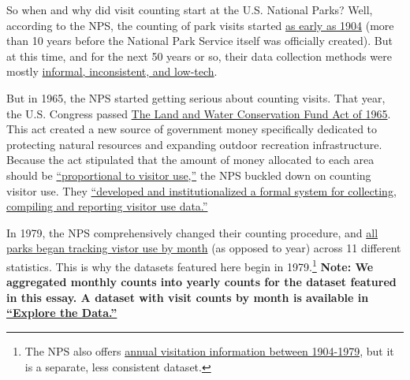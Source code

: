 \documentclass[
  letterpaper,
  DIV=11,
  numbers=noendperiod]{scrartcl}
\begin{document}
So when and why did visit counting start at the U.S. National Parks?
Well, according to the NPS, the counting of park visits started
\href{https://www.nps.gov/subjects/socialscience/visitor-use-statistics.htm}{as
early as 1904} (more than 10 years before the National Park Service
itself was officially created). But at this time, and for the next 50
years or so, their data collection methods were mostly
\href{https://www.nps.gov/subjects/socialscience/visitor-use-statistics.htm}{informal,
inconsistent, and low-tech}.

But in 1965, the NPS started getting serious about counting visits. That
year, the U.S. Congress passed
\href{https://www.everycrsreport.com/reports/RL33531.html}{The Land and
Water Conservation Fund Act of 1965}. This act created a new source of
government money specifically dedicated to protecting natural resources
and expanding outdoor recreation infrastructure. Because the act
stipulated that the amount of money allocated to each area should be
\href{https://www.nps.gov/subjects/socialscience/statistics-history.htm}{``proportional
to visitor use,''} the NPS buckled down on counting visitor use. They
\href{https://www.nps.gov/subjects/socialscience/statistics-history.htm}{``developed
and institutionalized a formal system for collecting, compiling and
reporting visitor use data.''}

In 1979, the NPS comprehensively changed their counting procedure, and
\href{(https://www.nps.gov/subjects/socialscience/visitor-use-statistics-dashboard.htm)}{all
parks began tracking vistor use by month} (as opposed to year) across 11
different statistics. This is why the datasets featured here begin in
1979.\footnote{The NPS also offers
  \href{https://irma.nps.gov/Stats/SSRSReports/National\%20Reports/Query\%20Builder\%20for\%20Historic\%20Annual\%20Recreation\%20Visits\%20(1904\%20-\%201979)}{annual
  visitation information between 1904-1979}, but it is a separate, less
  consistent dataset.} \textbf{Note: We aggregated monthly counts into
yearly counts for the dataset featured in this essay. A dataset with
visit counts by month is available in
\href{?tab=explore-the-data}{``Explore the Data.''}}
\end{document}
